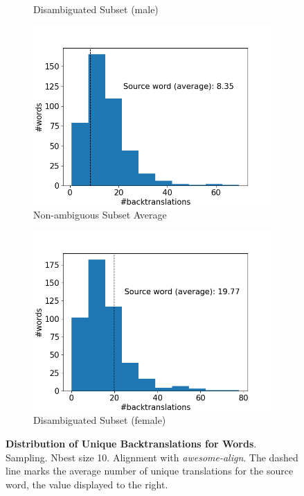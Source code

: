 \begin{figure}[!htb]
\begin{subfigure}{0.49\textwidth}
         \caption{Disambiguated Subset (male)}
     \end{subfigure}
     \begin{subfigure}{0.49\textwidth}
         \centering
         \includegraphics[width=\textwidth]{figures/alignment/align_sampling/word_backtranslations_average.png}
         \caption{Non-ambiguous Subset Average}
     \end{subfigure}
     \hfill
     \begin{subfigure}{0.49\textwidth}
         \centering
         \includegraphics[width=\textwidth]{figures/alignment/align_sampling/word_backtranslations_female.png}
         \caption{Disambiguated Subset (female)}
     \end{subfigure}
        \caption{\textbf{Distribution of Unique Backtranslations for Words}. Sampling. Nbest size 10. Alignment with \textit{awesome-align}. The dashed line marks the average number of unique translations for the source word, the value displayed to the right.}
        \label{fig:alignment_graphs_backtranslation_sampling}

\end{figure}